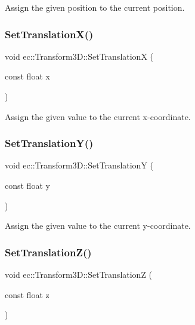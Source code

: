 Assign the given position to the current position. \mbox{\label{classec_1_1_transform3_d_a150e25babd8e2aeeb650c768e4d5d448}} 
\subsubsection{\texorpdfstring{Set\+Translation\+X()}{SetTranslationX()}}
{\footnotesize\ttfamily void ec\+::\+Transform3\+D\+::\+Set\+TranslationX (\begin{DoxyParamCaption}\item[{const float}]{x }\end{DoxyParamCaption})}

Assign the given value to the current x-\/coordinate. \mbox{\label{classec_1_1_transform3_d_a93cbe1baa33972865b10554fbacfddec}} 
\subsubsection{\texorpdfstring{Set\+Translation\+Y()}{SetTranslationY()}}
{\footnotesize\ttfamily void ec\+::\+Transform3\+D\+::\+Set\+TranslationY (\begin{DoxyParamCaption}\item[{const float}]{y }\end{DoxyParamCaption})}

Assign the given value to the current y-\/coordinate. \mbox{\label{classec_1_1_transform3_d_af7a125c99afbd7e53cf7b905c2ab1db4}} 
\subsubsection{\texorpdfstring{Set\+Translation\+Z()}{SetTranslationZ()}}
{\footnotesize\ttfamily void ec\+::\+Transform3\+D\+::\+Set\+TranslationZ (\begin{DoxyParamCaption}\item[{const float}]{z }\end{DoxyParamCaption})}

